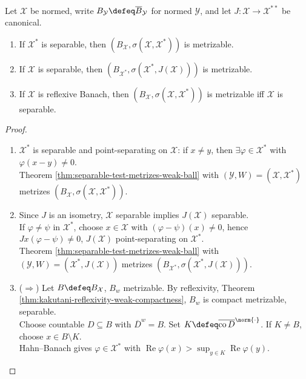 \begin{corollary} \label{cor:metrizability-of-weak-unit-balls} \\
Let $\mathcal X$ be normed, write $B_{\mathcal Y}\defeq\overline{B}_{\mathcal Y}$ for normed $\mathcal Y$, and let $J:\mathcal X\to\mathcal X^{**}$ be canonical.
\begin{enumerate}[label=(\roman*)]
\setlength{\itemsep}{0pt}
\item If $\mathcal X^*$ is separable, then $(B_{\mathcal X},\sigma(\mathcal X,\mathcal X^*))$ is metrizable.
\item If $\mathcal X$ is separable, then $(B_{\mathcal X^*},\sigma(\mathcal X^*,J(\mathcal X)))$ is metrizable.
\item If $\mathcal X$ is reflexive Banach, then $(B_{\mathcal X},\sigma(\mathcal X,\mathcal X^*))$ is metrizable iff $\mathcal X$ is separable.
\end{enumerate}
\begin{proof}
\begin{enumerate}[label=(\roman*)]
\setlength{\itemsep}{0pt}
\item $\mathcal X^*$ is separable and point-separating on $\mathcal X$: if $x\neq y$, then $\exists\varphi\in\mathcal X^*$ with $\varphi(x-y)\neq0$.\\
Theorem \ref{thm:separable-test-metrizes-weak-ball} with $(\mathcal Y,W)=(\mathcal X,\mathcal X^*)$ metrizes $(B_{\mathcal X},\sigma(\mathcal X,\mathcal X^*))$.
\item Since $J$ is an isometry, $\mathcal X$ separable implies $J(\mathcal X)$ separable.\\
If $\varphi\neq\psi$ in $\mathcal X^*$, choose $x\in\mathcal X$ with $(\varphi-\psi)(x)\neq0$, hence $Jx(\varphi-\psi)\neq0$, $J(\mathcal X)$ point-separating on $\mathcal X^*$.\\
Theorem \ref{thm:separable-test-metrizes-weak-ball} with $(\mathcal Y,W)=(\mathcal X^*,J(\mathcal X))$ metrizes $(B_{\mathcal X^*},\sigma(\mathcal X^*,J(\mathcal X)))$.
\item[$(iii)$] ($\Rightarrow$) Let $B\defeq B_{\mathcal X}$, $B_w$ metrizable. By reflexivity, Theorem \ref{thm:kakutani-reflexivity-weak-compactness}, $B_w$ is compact metrizable, separable.\\
Choose countable $D\subseteq B$ with $\overline D^w=B$. Set $K\defeq\overline{\operatorname{co}D}^{\norm{\cdot}}$. If $K\neq B$, choose $x\in B\setminus K$.\\
Hahn--Banach gives $\varphi\in\mathcal X^*$ with $\operatorname{Re}\varphi(x)>\sup_{y\in K}\operatorname{Re}\varphi(y)$.\\

\end{enumerate}
\end{proof}
\end{corollary}

